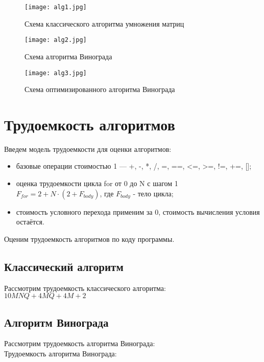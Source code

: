 \documentclass[12pt]{report}
\begin{document}
\begin{figure}[pt]
\centering
\texttt{[image: alg1.jpg]}
\caption{Схема классического алгоритма умножения матриц}
\label{fig:mpr}
\end{figure}

\begin{figure}[pt]
\centering
\texttt{[image: alg2.jpg]}
\caption{Схема алгоритма Винограда}
\label{fig:mpr}
\end{figure}


\begin{figure}[pt]
\centering
\texttt{[image: alg3.jpg]}
\caption{Схема оптимизированного алгоритма Винограда}
\label{fig:mpr}
\end{figure}

\newpage
\section{Трудоемкость алгоритмов}
Введем модель трудоемкости для оценки алгоритмов: 
\begin{itemize}
	\item базовые операции стоимостью 1 — +, -, *, /, =, ==, <=, >=, !=, +=, [];
	\item оценка трудоемкости цикла for от 0 до N с шагом 1 $F_{for} = 2 + N \cdot (2 + F_{body})$, где $F_{body}$ - тело цикла;
	\item стоимость условного перехода применим за 0, стоимость вычисления условия остаётся.
\end{itemize}

Оценим трудоемкость алгоритмов по коду программы.

\subsection{Классический алгоритм}
Рассмотрим трудоемкость классического алгоритма:\\

$10MNQ + 4MQ + 4 M + 2$ \\


\subsection{Алгоритм Винограда}

Рассмотрим трудоемкость алгоритма Винограда:\\

Трудоемкость алгоритма Винограда:\\
\end{document}
